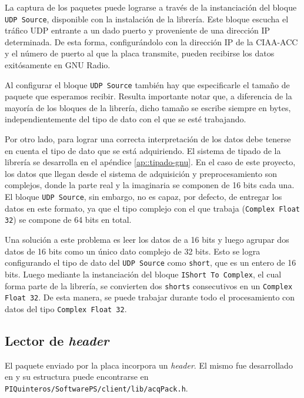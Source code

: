 \documentclass[../../main.tex]{subfiles}
\begin{document}
La captura de los paquetes puede lograrse a través de la instanciación del bloque \texttt{UDP Source}, disponible con la instalación de la librería. Este bloque escucha el tráfico UDP entrante a un dado puerto y proveniente de una dirección IP  determinada. De esta forma, configurándolo con la dirección IP de la CIAA-ACC y el número de puerto al que la placa transmite, pueden recibirse los datos exitósamente en GNU Radio. 

Al configurar el bloque \texttt{UDP Source} también hay que especificarle el tamaño de paquete que esperamos recibir. Resulta importante notar que, a diferencia de la mayoría de los bloques de la librería, dicho tamaño se escribe siempre en bytes, independientemente del tipo de dato con el que se esté trabajando.

Por otro lado, para lograr una correcta interpretación de los datos debe tenerse en cuenta el tipo de dato que se está adquiriendo. El sistema de tipado de la librería se desarrolla en el apéndice \ref{ap::tipado-gnu}. En el caso de este proyecto, los datos que llegan desde el sistema de adquisición y preprocesamiento son complejos, donde la parte real y la imaginaria se componen de 16 bits cada una.  El bloque \texttt{UDP Source}, sin embargo, no es capaz, por defecto, de entregar los datos en este formato, ya que el tipo complejo con el que trabaja (\texttt{Complex Float 32}) se compone de 64 bits en total.

Una solución a este problema es leer los datos de a 16 bits y luego agrupar dos datos de 16 bits como un único dato complejo de 32 bits. Esto se logra configurando el tipo de dato del \texttt{UDP Source} como \texttt{short}, que es un entero de 16 bits. Luego mediante la instanciación del bloque \texttt{IShort To Complex}, el cual forma parte de la librería, se convierten dos \texttt{shorts} consecutivos en un \texttt{Complex Float 32}. De esta manera, se puede trabajar durante todo el procesamiento con datos del tipo \texttt{Complex Float 32}.

\subsection{Lector de \textit{header}}
El paquete enviado por la placa incorpora un \textit{header}. El mismo fue desarrollado en \cite{proyecto-jose} y su estructura puede encontrarse en \texttt{PIQuinteros/SoftwarePS/client/lib/acqPack.h}.
\end{document}
